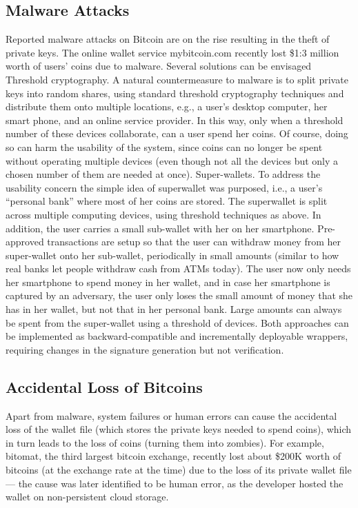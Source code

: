 \subsection{Malware Attacks}
Reported malware attacks on Bitcoin are on the rise resulting in the theft of private
keys. The online wallet service mybitcoin.com recently lost \$1:3 million worth
of users’ coins due to malware. Several solutions can be envisaged Threshold cryptography. A natural countermeasure to malware is to split private keys into random shares, using standard threshold cryptography techniques and distribute
them onto multiple locations, e.g., a user’s desktop computer, her smart phone,
and an online service provider. In this way, only when a threshold number of these devices
collaborate, can a user spend her coins. Of course, doing so can harm the usability
of the system, since coins can no longer be spent without operating multiple devices
(even though not all the devices but only a chosen number of them are needed at once).
Super-wallets. To address the usability concern the simple idea of superwallet was purposed,
i.e., a user’s “personal bank” where most of her coins are stored. The superwallet
is split across multiple computing devices, using threshold techniques as above.
In addition, the user carries a small sub-wallet with her on her smartphone. Pre-approved
transactions are setup so that the user can withdraw money from her super-wallet onto
her sub-wallet, periodically in small amounts (similar to how real banks let people withdraw
cash from ATMs today). The user now only needs her smartphone to spend money
in her wallet, and in case her smartphone is captured by an adversary, the user only loses
the small amount of money that she has in her wallet, but not that in her personal bank.
Large amounts can always be spent from the super-wallet using a threshold of devices.
Both approaches can be implemented as backward-compatible and incrementally
deployable wrappers, requiring changes in the signature generation but not verification.

\subsection{Accidental Loss of Bitcoins}
Apart from malware, system failures or human errors can cause the accidental loss of the
wallet file (which stores the private keys needed to spend coins), which in turn leads to
the loss of coins (turning them into zombies). For example, bitomat, the third largest
bitcoin exchange, recently lost about \$200K worth of bitcoins (at the exchange rate at
the time) due to the loss of its private wallet file — the cause was later identified to be
human error, as the developer hosted the wallet on non-persistent cloud storage.

